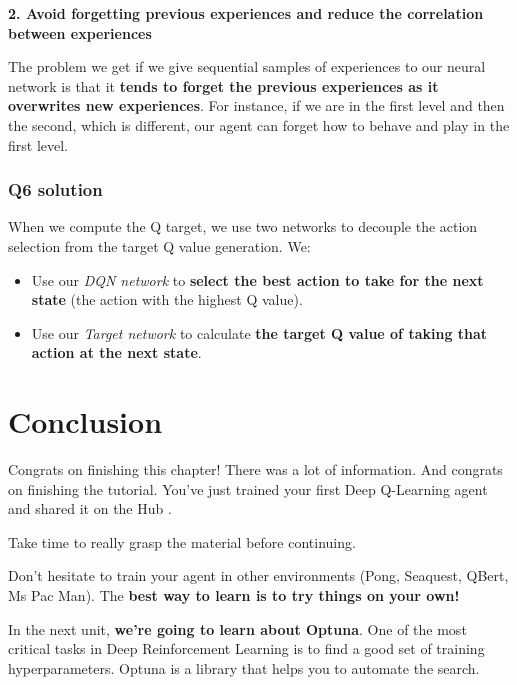 \documentclass[11pt,a4paper]{article}
\begin{document}
\textbf{2. Avoid forgetting previous experiences and reduce the correlation between experiences}

The problem we get if we give sequential samples of experiences to our neural network is that it \textbf{tends to forget the previous experiences as it overwrites new experiences}. For instance, if we are in the first level and then the second, which is different, our agent can forget how to behave and play in the first level.

\subsubsection{Q6 solution}\label{q6-solution}

When we compute the Q target, we use two networks to decouple the action selection from the target Q value generation. We:

\begin{itemize}
\item
  Use our \emph{DQN network} to \textbf{select the best action to take for the next state} (the action with the highest Q value).
\item
  Use our \emph{Target network} to calculate \textbf{the target Q value of taking that action at the next state}.
\end{itemize}

\section{Conclusion}\label{conclusion}

Congrats on finishing this chapter! There was a lot of information. And congrats on finishing the tutorial. You've just trained your first Deep Q-Learning agent and shared it on the Hub .

Take time to really grasp the material before continuing.

Don't hesitate to train your agent in other environments (Pong, Seaquest, QBert, Ms Pac Man). The \textbf{best way to learn is to try things on your own!}


In the next unit, \textbf{we're going to learn about Optuna}. One of the most critical tasks in Deep Reinforcement Learning is to find a good set of training hyperparameters. Optuna is a library that helps you to automate the search.
\end{document}
